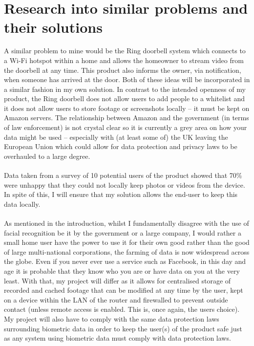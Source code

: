 \documentclass[9pt]{article}
\begin{document}
\section{Research into similar problems and their solutions}\label{sec_research}
A similar problem to mine would be the Ring doorbell system which connects to a Wi-Fi hotspot within a home and allows the homeowner to stream video from the doorbell at any time. This product also informs the owner, via notification, when someone has arrived at the door. Both of these ideas will be incorporated in a similar fashion in my own solution. In contrast to the intended openness of my product, the Ring doorbell does not allow users to add people to a whitelist and it does not allow users to store footage or screenshots locally – it must be kept on Amazon servers. The relationship between Amazon and the government (in terms of law enforcement) is not crystal clear so it is currently a grey area on how your data might be used – especially with (at least some of) the UK leaving the European Union which could allow for data protection and privacy laws to be overhauled to a large degree.\\\\
Data taken from a survey of 10 potential users of the product showed that 70\% were unhappy that they could not locally keep photos or videos from the device. In spite of this, I will ensure that my solution allows the end-user to keep this data locally.\\\\
As mentioned in the introduction, whilst I fundamentally disagree with the use of facial recognition be it by the government or a large company, I would rather a small home user have the power to use it for their own good rather than the good of large multi-national corporations, the farming of data is now widespread across the globe. Even if you never ever use a service such as Facebook, in this day and age it is probable that they know who you are or have data on you at the very least. With that, my project will differ as it allows for centralised storage of recorded and cached footage that can be modified at any time by the user, kept on a device within the LAN of the router and firewalled to prevent outside contact (unless remote access is enabled. This is, once again, the users choice). My project will also have to comply with the same data protection laws surrounding biometric data in order to keep the user(s) of the product safe just as any system using biometric data must comply with data protection laws.\\\\
\end{document}
